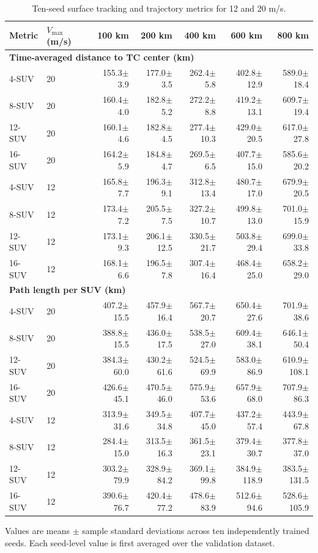 \begin{table}[p]
\centering
\caption{Ten-seed surface tracking and trajectory metrics for 12 and 20 m/s.}
\label{tab:surface_vmax_dynamic}
\scriptsize
\setlength{\tabcolsep}{3pt}
\begin{tabular}{@{}llrrrrr@{}}
\toprule
Metric & $V_{\max}$ (m/s) & 100 km & 200 km & 400 km & 600 km & 800 km \\
\midrule
\multicolumn{7}{l}{\textbf{Time-averaged distance to TC center (km)}} \\
4-SUV & 20 & 155.3$\pm$3.9 & 177.0$\pm$3.5 & 262.4$\pm$5.8 & 402.8$\pm$12.9 & 589.0$\pm$18.4 \\
8-SUV & 20 & 160.4$\pm$4.0 & 182.8$\pm$5.2 & 272.2$\pm$8.8 & 419.2$\pm$13.1 & 609.7$\pm$19.4 \\
12-SUV & 20 & 160.1$\pm$4.6 & 182.8$\pm$4.5 & 277.4$\pm$10.3 & 429.0$\pm$20.5 & 617.0$\pm$27.8 \\
16-SUV & 20 & 164.2$\pm$5.9 & 184.8$\pm$4.7 & 269.5$\pm$6.5 & 407.7$\pm$15.0 & 585.6$\pm$20.2 \\
4-SUV & 12 & 165.8$\pm$7.7 & 196.3$\pm$9.1 & 312.8$\pm$13.4 & 480.7$\pm$17.0 & 679.9$\pm$20.5 \\
8-SUV & 12 & 173.4$\pm$7.2 & 205.5$\pm$7.5 & 327.2$\pm$10.7 & 499.8$\pm$13.0 & 701.0$\pm$15.9 \\
12-SUV & 12 & 173.1$\pm$9.3 & 206.1$\pm$12.5 & 330.5$\pm$21.7 & 503.8$\pm$29.4 & 699.0$\pm$33.8 \\
16-SUV & 12 & 168.1$\pm$6.6 & 196.5$\pm$7.8 & 307.4$\pm$16.4 & 468.4$\pm$25.0 & 658.2$\pm$29.0 \\
\midrule
\multicolumn{7}{l}{\textbf{Path length per SUV (km)}} \\
4-SUV & 20 & 407.2$\pm$15.5 & 457.9$\pm$16.4 & 567.7$\pm$20.7 & 650.4$\pm$27.6 & 701.9$\pm$38.6 \\
8-SUV & 20 & 388.8$\pm$15.5 & 436.0$\pm$17.5 & 538.5$\pm$27.0 & 609.4$\pm$38.1 & 646.1$\pm$50.4 \\
12-SUV & 20 & 384.3$\pm$60.0 & 430.2$\pm$61.6 & 524.5$\pm$69.9 & 583.0$\pm$86.9 & 610.9$\pm$108.1 \\
16-SUV & 20 & 426.6$\pm$45.1 & 470.5$\pm$46.0 & 575.9$\pm$53.6 & 657.9$\pm$68.0 & 707.9$\pm$86.3 \\
4-SUV & 12 & 313.9$\pm$31.6 & 349.5$\pm$34.8 & 407.7$\pm$45.0 & 437.2$\pm$57.4 & 443.9$\pm$67.8 \\
8-SUV & 12 & 284.4$\pm$15.0 & 313.5$\pm$16.3 & 361.5$\pm$23.1 & 379.4$\pm$30.7 & 377.8$\pm$37.0 \\
12-SUV & 12 & 303.2$\pm$79.9 & 328.9$\pm$84.2 & 369.1$\pm$99.8 & 384.9$\pm$118.9 & 383.5$\pm$131.5 \\
16-SUV & 12 & 390.6$\pm$76.7 & 420.4$\pm$77.2 & 478.6$\pm$83.9 & 512.6$\pm$94.6 & 528.6$\pm$105.9 \\
\bottomrule
\end{tabular}
\par\smallskip
\parbox{\textwidth}{\footnotesize Values are means $\pm$ sample standard deviations across ten independently trained seeds. Each seed-level value is first averaged over the validation dataset.}
\end{table}
